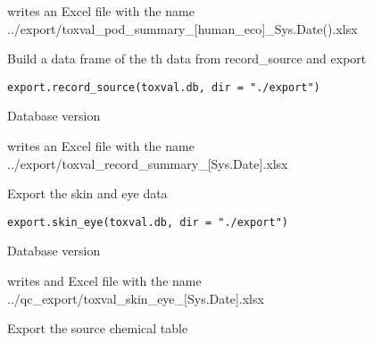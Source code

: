 \documentclass[letterpaper]{book}
\begin{document}
%
\begin{Value}
writes an Excel file with the name
../export/toxval\_pod\_summary\_[human\_eco]\_Sys.Date().xlsx
\end{Value}
%
\begin{Description}\relax
Build a data frame of the th data from record\_source and export
\end{Description}
%
\begin{Usage}
\begin{verbatim}
export.record_source(toxval.db, dir = "./export")
\end{verbatim}
\end{Usage}
%
\begin{Arguments}
\begin{ldescription}
\item[\code{toxval.db}] Database version
\end{ldescription}
\end{Arguments}
%
\begin{Value}
writes an Excel file with the name
../export/toxval\_record\_summary\_[Sys.Date].xlsx
\end{Value}
%
\begin{Description}\relax
Export the skin and eye data
\end{Description}
%
\begin{Usage}
\begin{verbatim}
export.skin_eye(toxval.db, dir = "./export")
\end{verbatim}
\end{Usage}
%
\begin{Arguments}
\begin{ldescription}
\item[\code{toxval.db}] Database version
\end{ldescription}
\end{Arguments}
%
\begin{Value}
writes and Excel file with the name
../qc\_export/toxval\_skin\_eye\_[Sys.Date].xlsx
\end{Value}
%
\begin{Description}\relax
Export the source chemical table
\end{Description}
\end{document}
